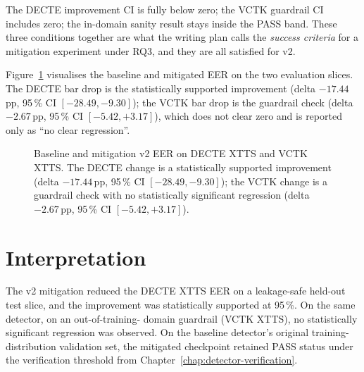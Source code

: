 The DECTE improvement CI is fully below zero; the VCTK guardrail
CI includes zero; the in-domain sanity result stays inside the
PASS band. These three conditions together are what the writing
plan calls the \emph{success criteria} for a mitigation experiment
under RQ3, and they are all satisfied for v2.

Figure~\ref{fig:mitigation-effect} visualises the baseline and
mitigated EER on the two evaluation slices. The DECTE bar drop is
the statistically supported improvement (delta $-17.44$\,pp,
95\,\% CI $[-28.49, -9.30]$); the VCTK bar drop is the guardrail
check (delta $-2.67$\,pp, 95\,\% CI $[-5.42, +3.17]$), which
does not clear zero and is reported only as ``no clear regression''.

\begin{figure}[t]
\centering
{}
\caption{Baseline and mitigation v2 EER on DECTE XTTS and VCTK XTTS. The DECTE change is a statistically supported improvement (delta $-17.44$\,pp, 95\,\% CI $[-28.49, -9.30]$); the VCTK change is a guardrail check with no statistically significant regression (delta $-2.67$\,pp, 95\,\% CI $[-5.42, +3.17]$).}
\label{fig:mitigation-effect}
\end{figure}


\section{Interpretation}
\label{sec:mitigation-interpretation}

The v2 mitigation reduced the DECTE XTTS EER on a leakage-safe
held-out test slice, and the improvement was statistically
supported at 95\,\%. On the same detector, on an out-of-training-%
domain guardrail (VCTK XTTS), no statistically significant
regression was observed. On the baseline detector's original
training-distribution validation set, the mitigated checkpoint
retained PASS status under the verification threshold from
Chapter~\ref{chap:detector-verification}.

